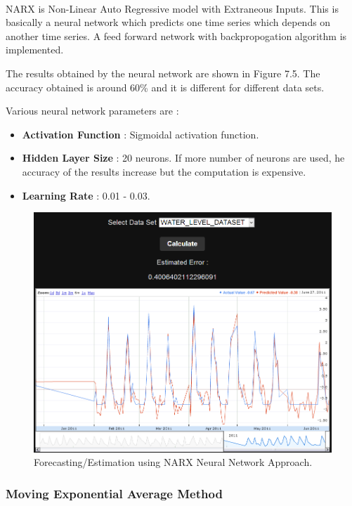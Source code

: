 \documentclass[12pt,a4paper]{report}
\begin{document}
\paragraph{} NARX is Non-Linear Auto Regressive model with Extraneous Inputs. This is basically a neural network which predicts one time series which depends on another time series. A feed forward network with backpropogation algorithm is implemented. 


The results obtained by the neural network are shown in Figure 7.5. The accuracy obtained is around 60\% and it is different for different data sets.

Various neural network parameters are :
\begin{itemize}
\item \textbf{Activation Function} : Sigmoidal activation function.
\item \textbf{Hidden Layer Size} : 20 neurons. If more number of neurons are used, he accuracy of the results increase but the computation is expensive.
\item \textbf{Learning Rate } : 0.01 - 0.03. 
\end{itemize}

\begin{figure}[h!]

  \centering
    \includegraphics[scale=0.35]{./screenshots/result_fort_NN.png}
  \caption{Forecasting/Estimation using NARX Neural Network Approach.}
\end{figure}

\subsubsection{Moving Exponential Average Method}
\end{document}
